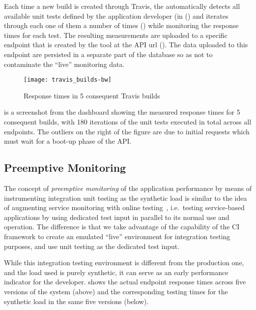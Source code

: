   Each time a new build is created through Travis, the \tool automatically detects all available unit tests defined by the application developer (in () and iterates through each one of them a number of times () while monitoring the response times for each test. The resulting measurements are uploaded to a specific endpoint that is created by the tool at the API url (). The data uploaded to this endpoint are persisted in a separate part of the \tool database so as not to contaminate the ``live'' monitoring data. 

      \begin{figure}[h!]
        \centering
        \texttt{[image: travis\_builds-bw]}
        \caption{Response times in 5 consequent Travis builds}
        \label{fig:builds}
      \end{figure}

   is a screenshot from the dashboard showing the measured response times for 5 consequent builds, with 180 iterations of the unit tests executed in total across all endpoints. The outliers on the right of the figure are due to initial requests which must wait for a boot-up phase of the API.
  


  \subsection*{Preemptive Monitoring}
  The concept of {\em preemptive monitoring} of the application performance by means of instrumenting integration unit testing as the synthetic load is similar to the idea of augmenting service monitoring with online testing~\cite{metzger2010proactive}, i.e.~testing service-based applications by using dedicated test input in parallel to its normal use and operation. The difference is that we take advantage of the capability of the CI framework to create an emulated ``live'' environment for integration testing purposes, and use unit testing as the dedicated test input. %
  
  While this integration testing environment is different from the production one, and the load used is purely synthetic, it can serve as an early performance indicator for the developer.   shows the actual endpoint response times across five versions of the system (above) and the corresponding testing times for the synthetic load in the same five versions (below). 

